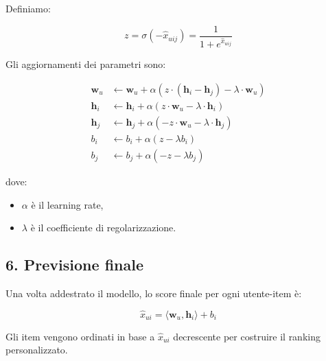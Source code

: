 \documentclass{article}
\begin{document}
Definiamo:

\[
z = \sigma(-\hat{x}_{uij}) = \frac{1}{1 + e^{\hat{x}_{uij}}}
\]

Gli aggiornamenti dei parametri sono:

\begin{align*}
\mathbf{w}_u &\leftarrow \mathbf{w}_u + \alpha \left( z \cdot (\mathbf{h}_i - \mathbf{h}_j) - \lambda \cdot \mathbf{w}_u \right) \\
\mathbf{h}_i &\leftarrow \mathbf{h}_i + \alpha \left( z \cdot \mathbf{w}_u - \lambda \cdot \mathbf{h}_i \right) \\
\mathbf{h}_j &\leftarrow \mathbf{h}_j + \alpha \left( -z \cdot \mathbf{w}_u - \lambda \cdot \mathbf{h}_j \right) \\
b_i &\leftarrow b_i + \alpha (z - \lambda b_i) \\
b_j &\leftarrow b_j + \alpha (-z - \lambda b_j)
\end{align*}

dove:
\begin{itemize}
    \item \( \alpha \) è il learning rate,
    \item \( \lambda \) è il coefficiente di regolarizzazione.
\end{itemize}

\subsection*{6. Previsione finale}

Una volta addestrato il modello, lo score finale per ogni utente-item è:

\[
\hat{x}_{ui} = \langle \mathbf{w}_u, \mathbf{h}_i \rangle + b_i
\]

Gli item vengono ordinati in base a \( \hat{x}_{ui} \) decrescente per costruire il ranking personalizzato.





\end{document}
